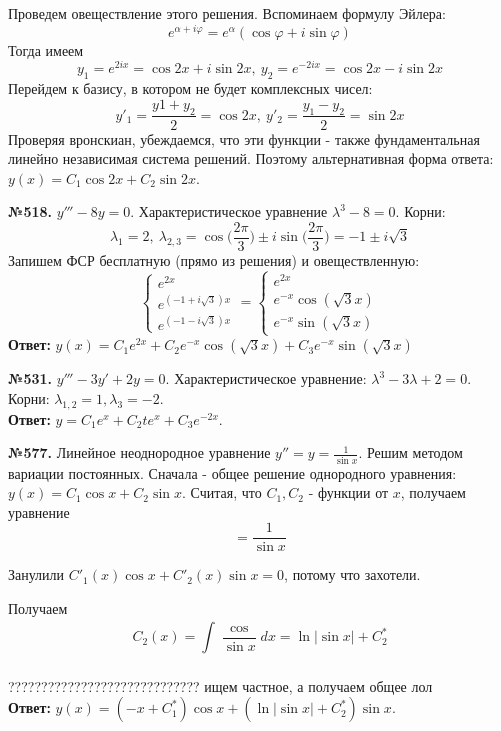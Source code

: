Проведем овеществление этого решения. Вспоминаем формулу Эйлера:
$$\boxed{e^{\alpha+i\varphi}=e^\alpha(\cos\varphi+i\sin\varphi)}$$ 
Тогда имеем
$$y_1=e^{2ix}=\cos 2x + i\sin2x,~y_2=e^{-2ix}=\cos 2x -i\sin 2x$$
Перейдем к базису, в котором не будет комплексных чисел:
$$y'_1=\frac{y1+y_2}{2}=\cos 2x,~y'_2 = \frac{y_1-y_2}{2} =\sin 2x$$
Проверяя вронскиан, убеждаемся, что эти функции - также фундаментальная
линейно независимая система решений. Поэтому альтернативная форма ответа:
$y(x) = C_1\cos 2x + C_2\sin 2x$. 



\textbf{№518.} $y'''-8y=0$. Характеристическое уравнение 
$\lambda^3 - 8 = 0$. Корни: $$\lambda_1 = 2,~\lambda_{2,3} = 
\cos\Big(\frac{2\pi}{3}\Big)\pm i\sin\Big(\frac{2\pi}{3}\Big)=-1\pm i\sqrt{3}$$
Запишем ФСР бесплатную (прямо из решения) и овеществленную:
$$\begin{cases}
    e^{2x} \\ e^{(-1+i\sqrt{3})x} \\ e^{(-1-i\sqrt{3})x} \end{cases} = 
\begin{cases}
    e^{2x} \\ e^{-x}\cos(\sqrt{3}x) \\ e^{-x}\sin(\sqrt{3}x)
\end{cases}$$
\textbf{Ответ:} $y(x) = 
C_1e^{2x} + C_2e^{-x}\cos(\sqrt{3}x)+C_3e^{-x}\sin(\sqrt{3}x )$


\textbf{№531.} $y'''-3y'+2y = 0$. 
Характеристическое уравнение: $\lambda^3-3\lambda+2=0$. 
Корни: $\lambda_{1,2}=1,\lambda_3=-2$.\\
\textbf{Ответ:} $y=C_1e^{x}+C_2te^{x}+C_3e^{-2x}$. 

\textbf{№577.} Линейное неоднородное уравнение $y'' = y = \frac{1}{\sin x}$. 
Решим методом вариации постоянных. Сначала - общее решение 
однородного уравнения: $y(x)= C_1\cos x + C_2 \sin x$. 
Считая, что $C_1,C_2$ - функции от $x$, получаем уравнение
$$ = \frac{1}{\sin x}$$ 


Занулили $C'_1(x)\cos x + C'_2(x)\sin x = 0$, потому что захотели.

Получаем 
$$C_2(x)=\int\limits_{}^{}\frac{\cos }{\sin x}dx = \ln|\sin x|+C^*_2$$


    ?????????????????????????????
ищем частное, а получаем общее лол\\
\textbf{Ответ:} $y(x) = (-x+C^*_1)\cos x + (\ln|\sin x| + C^*_2)\sin x$.














